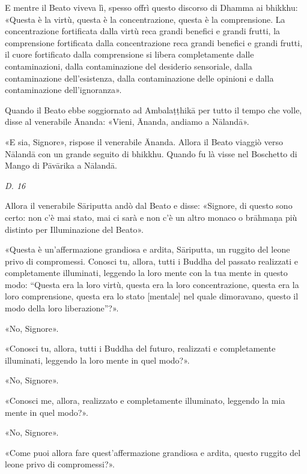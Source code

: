 E mentre il Beato viveva lì, spesso offrì questo discorso di Dhamma ai
bhikkhu: «Questa è la virtù, questa è la concentrazione, questa è la
comprensione. La concentrazione fortificata dalla virtù reca grandi
benefici e grandi frutti, la comprensione fortificata dalla
concentrazione reca grandi benefici e grandi frutti, il cuore
fortificato dalla comprensione si libera completamente dalle
contaminazioni, dalla contaminazione del desiderio sensoriale, dalla
contaminazione dell’esistenza, dalla contaminazione delle opinioni e
dalla contaminazione dell’ignoranza».


Quando il Beato ebbe soggiornato ad Ambalaṭṭhikā per tutto il tempo che
volle, disse al venerabile Ānanda: «Vieni, Ānanda, andiamo a Nālandā».


«E sia, Signore», rispose il venerabile Ānanda. Allora il Beato viaggiò
verso Nālandā con un grande seguito di bhikkhu. Quando fu là visse nel
Boschetto di Mango di Pāvārika a Nālandā.


\emph{D. 16}


Allora il venerabile Sāriputta andò dal Beato e disse: «Signore, di
questo sono certo: non c’è mai stato, mai ci sarà e non c’è un altro
monaco o brāhmaṇa più distinto per Illuminazione del Beato».


«Questa è un’affermazione grandiosa e ardita, Sāriputta, un ruggito del
leone privo di compromessi. Conosci tu, allora, tutti i Buddha del
passato realizzati e completamente illuminati, leggendo la loro mente
con la tua mente in questo modo: “Questa era la loro virtù, questa era
la loro concentrazione, questa era la loro comprensione, questa era lo
stato [mentale] nel quale dimoravano, questo il modo della loro
liberazione”?».


«No, Signore».


«Conosci tu, allora, tutti i Buddha del futuro, realizzati e
completamente illuminati, leggendo la loro mente in quel modo?».


«No, Signore».


«Conosci me, allora, realizzato e completamente illuminato, leggendo la
mia mente in quel modo?».


«No, Signore».


«Come puoi allora fare quest’affermazione grandiosa e ardita, questo
ruggito del leone privo di compromessi?».


